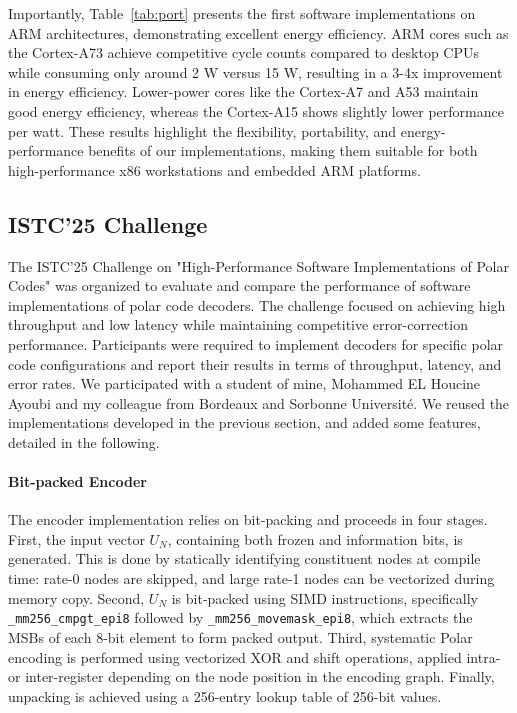 \documentclass[11pt]{report}
\begin{document}
Importantly, Table~\ref{tab:port} presents the first software implementations on ARM architectures, demonstrating excellent energy efficiency. ARM cores such as the Cortex-A73 achieve competitive cycle counts compared to desktop CPUs while consuming only around 2 W versus 15 W, resulting in a 3-4x improvement in energy efficiency. Lower-power cores like the Cortex-A7 and A53 maintain good energy efficiency, whereas the Cortex-A15 shows slightly lower performance per watt. These results highlight the flexibility, portability, and energy-performance benefits of our implementations, making them suitable for both high-performance x86 workstations and embedded ARM platforms.


\subsection{ISTC'25 Challenge}
\label{sec:istc25_challenge}

The ISTC'25 Challenge on "High-Performance Software Implementations of Polar Codes" was organized to evaluate and compare the performance of software implementations of polar code decoders. The challenge focused on achieving high throughput and low latency while maintaining competitive error-correction performance. Participants were required to implement decoders for specific polar code configurations and report their results in terms of throughput, latency, and error rates. We participated with a student of mine, Mohammed EL Houcine Ayoubi and my colleague from Bordeaux and Sorbonne Université. We reused the implementations developed in the previous section, and added some features, detailed in the following.

\paragraph{Bit-packed Encoder}
\label{encoder}
The encoder implementation relies on bit-packing and proceeds in four stages. First, the input vector $U_N$, containing both frozen and information bits, is generated. This is done by statically identifying constituent nodes at compile time: rate-0 nodes are skipped, and large rate-1 nodes can be vectorized during memory copy. Second, $U_N$ is bit-packed using SIMD instructions, specifically \texttt{\_mm256\_cmpgt\_epi8} followed by \texttt{\_mm256\_movemask\_epi8}, which extracts the MSBs of each 8-bit element to form packed output. Third, systematic Polar encoding is performed using vectorized XOR and shift operations, applied intra- or inter-register depending on the node position in the encoding graph. Finally, unpacking is achieved using a 256-entry lookup table of 256-bit values.
\end{document}
